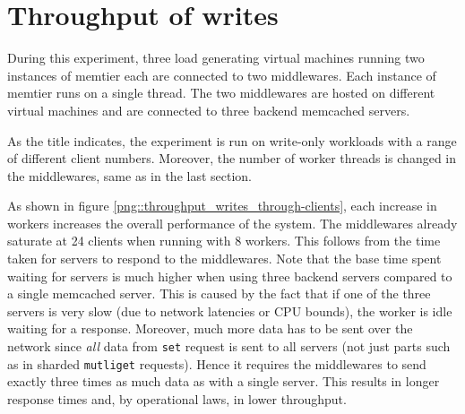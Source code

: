 \documentclass[11pt,a4paper]{article}
\begin{document}
\newpage

\section{Throughput of writes}
During this experiment, three load generating virtual machines running two instances of memtier each are connected to two middlewares. Each instance of memtier runs on a single thread. The two middlewares are hosted on different virtual machines and are connected to three backend memcached servers.

As the title indicates, the experiment is run on write-only workloads with a range of different client numbers. Moreover, the number of worker threads is changed in the middlewares, same as in the last section.

As shown in figure \ref{png::throughput_writes_through-clients}, each increase in workers increases the overall performance of the system. The middlewares already saturate at 24 clients when running with 8 workers. This follows from the time taken for servers to respond to the middlewares. Note that the base time spent waiting for servers is much higher when using three backend servers compared to a single memcached server. This is caused by the fact that if one of the three servers is very slow (due to network latencies or CPU bounds), the worker is idle waiting for a response. Moreover, much more data has to be sent over the network since \textit{all} data from \texttt{set} request is sent to all servers (not just parts such as in sharded \texttt{mutliget} requests). Hence it requires the middlewares to send exactly three times as much data as with a single server. This results in longer response times and, by operational laws, in lower throughput.
\end{document}
